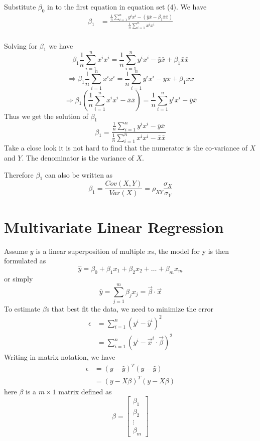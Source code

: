 \documentclass[12pt, oneside]{article}
\begin{document}
Substitute $\beta_0$ in to the first equation in equation set (4). We have 
\begin{align*}
{\beta_1}&=\frac{\frac{1}{n}\sum\limits_{i=1}^{n}y^{i}x^{i}-(\bar{y}\bar{x}-\beta_1\bar{x}\bar{x})}{\frac{1}{n}\sum\limits_{i=1}^{n}x^{i}x^{i}}\\
\end{align*}

Solving for $\beta_1$ we have
\begin{equation*}
\beta_1{\frac{1}{n}\sum\limits_{i=1}^{n}x^{i}x^{i}}=\frac{1}{n}\sum\limits_{i=1}^{n}y^{i}x^{i}-\bar{y}\bar{x}+\beta_1\bar{x}\bar{x}
\end{equation*}
\begin{equation*}
\Rightarrow
\beta_1{\frac{1}{n}\sum\limits_{i=1}^{n}x^{i}x^{i}}=\frac{1}{n}\sum\limits_{i=1}^{n}y^{i}x^{i}-\bar{y}\bar{x}+\beta_1\bar{x}\bar{x}
\end{equation*}
\begin{equation*}
\Rightarrow
\beta_1({\frac{1}{n}\sum\limits_{i=1}^{n}x^{i}x^{i}}-\bar{x}\bar{x})=\frac{1}{n}\sum\limits_{i=1}^{n}y^{i}x^{i}-\bar{y}\bar{x}
\end{equation*}
Thus we get the solution of $\beta_1$
\begin{equation}
\beta_1=\frac{\frac{1}{n}\sum\limits_{i=1}^{n}y^{i}x^{i}-\bar{y}\bar{x}}{{\frac{1}{n}\sum\limits_{i=1}^{n}x^{i}x^{i}}-\bar{x}\bar{x}}
\end{equation}
Take a close look it is not hard to find that the numerator is the co-variance of $X$ and $Y$. The denominator is the variance of $X$.

Therefore $\beta_1$ can also be written as 
\begin{equation}
\beta_1=\frac{Cov(X,Y)}{Var(X)}=\rho_{XY}\frac{\sigma_X}{\sigma_Y}
\end{equation}

\section{Multivariate Linear Regression}

Assume $y$ is a linear superposition of multiple $x$s, the model for y is then formulated as 
$$\hat{y}=\beta_{0}+\beta_{1}x_1+\beta_{2}x_2+\hdots+\beta_{m}x_m$$
or simply
$$
\hat{y}=\sum\limits_{j=1}^{m}\beta_j x_j=\vec{\beta}\cdot\vec{x}
$$
To estimate $\beta$s that best fit the data, we need to minimize the error
\begin{align}
\epsilon&={\sum\limits_{i=1}^{n}(y^{i}-\hat{y}^{i})^2}\\
&={\sum\limits_{i=1}^{n}(y^{i}-\vec{x}^i\cdot\vec{\beta})^2}
\end{align}
Writing in matrix notation, we have
\begin{align*}
\epsilon&={(y-\hat{y})^T(y-\hat{y})}\\
&=(y-X\beta)^T(y-X\beta)
\end{align*}
here $\beta$ is a $m\times1$ matrix defined as 
$$
\beta=\begin{bmatrix}
    \beta_1\\
    \beta_2\\
	\vdots\\
    \beta_m
\end{bmatrix}
$$
\end{document}

